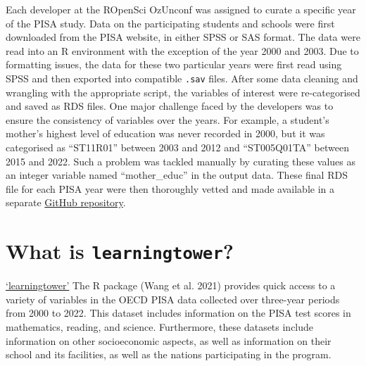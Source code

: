 Each developer at the ROpenSci OzUnconf was assigned to curate a specific year of the PISA study. Data on the participating students and schools were first downloaded from the PISA website, in either SPSS or SAS format. The data were read into an R environment with the exception of the year 2000 and 2003. Due to formatting issues, the data for these two particular years were first read using SPSS and then exported into compatible \texttt{.sav} files. After some data cleaning and wrangling with the appropriate script, the variables of interest were re-categorised and saved as RDS files. One major challenge faced by the developers was to ensure the consistency of variables over the years. For example, a student's mother's highest level of education was never recorded in 2000, but it was categorised as ``ST11R01'' between 2003 and 2012 and ``ST005Q01TA'' between 2015 and 2022. Such a problem was tackled manually by curating these values as an integer variable named ``mother\_educ'' in the output data. These final RDS file for each PISA year were then thoroughly vetted and made available in a separate \href{https://github.com/kevinwang09/learningtower_masonry}{GitHub repository}.

\hypertarget{what-is-learningtower}{%
\section{\texorpdfstring{What is \texttt{learningtower}?}{What is learningtower?}}\label{what-is-learningtower}}

\href{https://cran.r-project.org/web/packages/learningtower/index.html}{`learningtower'} The R package (Wang et al. 2021) provides quick access to a variety of variables in the OECD PISA data collected over three-year periods from 2000 to 2022. This dataset includes information on the PISA test scores in mathematics, reading, and science. Furthermore, these datasets include information on other socioeconomic aspects, as well as information on their school and its facilities, as well as the nations participating in the program.

